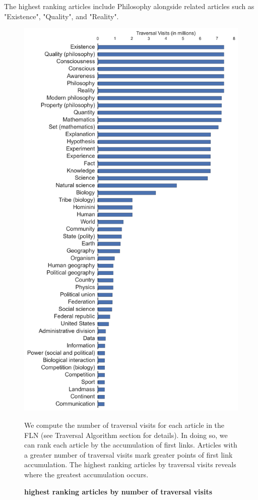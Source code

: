 \documentclass[pre,twocolumn,twoside,superscriptaddress,floatfix, aps, 10pt]{revtex4-1}
\begin{document}
The highest ranking articles include Philosophy alongside related articles such as "Existence", "Quality", and "Reality".

\begin{figure}[tp!]
  \centering	
  \includegraphics[width=\columnwidth]{graphics/articles_ranked.png}
  \caption{
    \textbf{highest ranking articles by number of traversal visits}
  }
  We compute the number of traversal visits for each article in the FLN (see 
  Traversal Algorithm section for details). In doing so, we can rank each article
  by the accumulation of first links. Articles with a greater number of traversal visits
  mark greater points of first link accumulation. The highest ranking articles by traversal visits reveals where the greatest accumulation occurs.
  \label{fig:highest visits}
\end{figure}
\end{document}

